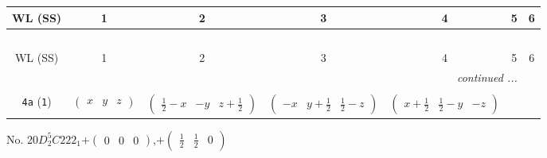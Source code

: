 \documentclass[fleqn,9pt,landscape]{jsarticle}
\begin{document}
\begin{center}
\renewcommand{\arraystretch}{1.2}
\begin{longtable}{ccccccc}
 \hline \hline
WL (SS) & 1 & 2 & 3 & 4 & 5 & 6 \\ \hline \endfirsthead

\multicolumn{6}{l}{\tablename\ \thetable{}} \\
 \hline \hline
WL (SS) & 1 & 2 & 3 & 4 & 5 & 6 \\ \hline \endhead

 \hline \hline
\multicolumn{6}{r}{\footnotesize\it continued ...} \\ \endfoot

 \hline \hline
\multicolumn{6}{r}{} \\ \endlastfoot

{\tt 4a} ({\tt 1}) & $ \begin{pmatrix} x & y & z \end{pmatrix} $ & $ \begin{pmatrix} \frac{1}{2} - x & - y & z + \frac{1}{2} \end{pmatrix} $ & $ \begin{pmatrix} - x & y + \frac{1}{2} & \frac{1}{2} - z \end{pmatrix} $ & $ \begin{pmatrix} x + \frac{1}{2} & \frac{1}{2} - y & - z \end{pmatrix} $ \\
\end{longtable}
\end{center}
\newpage
No. 20\quad$D_{2}^{5}$\quad$C222_1$\quad[ orthorhombic ]\quad$+\begin{pmatrix} 0 & 0 & 0 \end{pmatrix}$,\quad $+\begin{pmatrix} \frac{1}{2} & \frac{1}{2} & 0 \end{pmatrix}$
\end{document}

